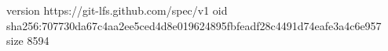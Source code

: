version https://git-lfs.github.com/spec/v1
oid sha256:707730da67c4aa2ee5ced4d8e019624895fbfeadf28c4491d74eafe3a4c6e957
size 8594
